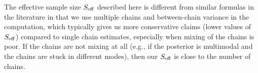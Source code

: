 \documentclass[american,]{article}
\providecommand{\tightlist}{%
  \setlength{\itemsep}{0pt}\setlength{\parskip}{0pt}}
\begin{document}
The effective sample size \(S_{\rm eff}\) described here is different
from similar formulas in the literature in that we use multiple chains
and between-chain variance in the computation, which typically gives us
more conservative claims (lower values of \(S_{\rm eff}\)) compared to
single chain estimates, especially when mixing of the chains is poor. If
the chains are not mixing at all (e.g., if the posterior is multimodal and
the chains are stuck in different modes), then our \(S_{\rm eff}\) is
close to the number of chains.






\end{document}

